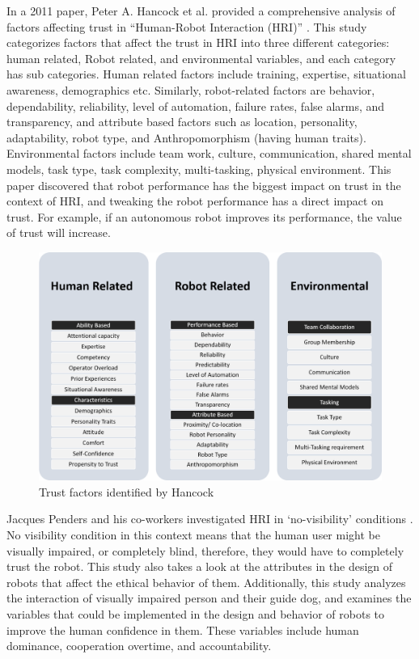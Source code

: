 \documentclass[runningheads,a4paper]{llncs}
\begin{document}
In a 2011 paper, Peter A. Hancock et al. provided a comprehensive analysis of factors affecting trust in ``Human-Robot Interaction (HRI)'' \cite{hancock2011meta}. This study categorizes factors that affect the trust in HRI into three different categories: human related, Robot related, and environmental variables, and each category has sub categories. Human related factors include training, expertise, situational awareness, demographics etc. Similarly, robot-related factors are behavior, dependability, reliability, level of automation, failure rates, false alarms, and transparency, and attribute based factors such as location, personality, adaptability, robot type, and Anthropomorphism (having human traits). Environmental factors include team work, culture, communication, shared mental models, task type, task complexity, multi-tasking, physical environment. This paper discovered that robot performance has the biggest impact on trust in the context of HRI, and tweaking the robot performance has a direct impact on trust. For example, if an autonomous robot improves its performance, the value of trust will increase.

\begin{figure}
	\centering
		\includegraphics[width=\textwidth]{Figures/TrustFactors.png}
	\caption{Trust factors identified by Hancock \cite{hancock2011meta}}
\end{figure}

\newpage

Jacques Penders and his co-workers investigated HRI in `no-visibility' conditions \cite{penders2013enhancing}. No visibility condition in this context means that the human user might be visually impaired, or completely blind, therefore, they would have to completely trust the robot. This study also takes a look at the attributes in the design of robots that affect the ethical behavior of them. Additionally, this study analyzes the interaction of visually impaired person and their guide dog, and examines the variables that could be implemented in the design and behavior of robots to improve the human confidence in them. These variables include human dominance, cooperation overtime, and accountability.
\end{document}
